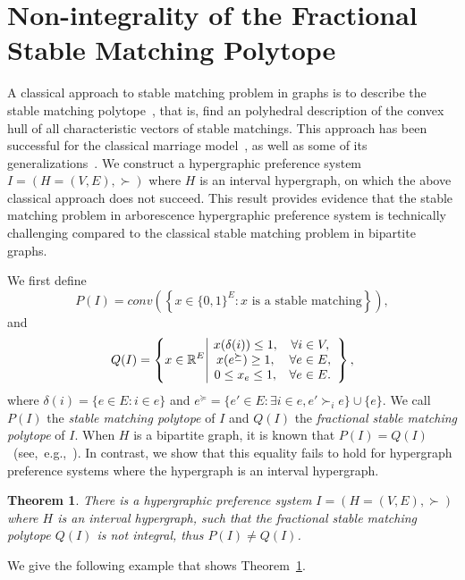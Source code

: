 \documentclass[11pt]{article}
\newtheorem{theorem}{Theorem}
\begin{document}
\section{Non-integrality of the Fractional Stable Matching Polytope}\label{sec:negative}




A classical approach to stable matching problem in graphs is to describe the stable matching polytope~\cite{teo1998geometry}, that is, find an polyhedral description of the convex hull of all characteristic vectors of stable matchings. This approach has been successful for the classical marriage model~\cite{rothblum1992characterization,vate1989linear}, as well as some of its generalizations~\cite{faenza2023affinely,fleiner2003stable}. We construct a hypergraphic preference system $I=(H=(V,E),\succ)$ where $H$ is an interval hypergraph, on which the above classical approach does not succeed. This result provides evidence that the stable matching problem in arborescence hypergraphic preference system is technically challenging compared to the classical stable matching problem in bipartite graphs. 

We first define 
\begin{equation}
    P(I)=conv\left(\left\{x\in \{0,1\}^E:x\textrm{ is a stable matching} 
    \right\}\right),
\end{equation}
and
\begin{equation}
    Q(I)=\left\{x\in \mathbb{R}^E\,\vline
    \begin{array}{cc}
      x(\delta(i)) \le 1,  &  \forall i\in V, \\
      x(e^\succeq) \ge 1,   & \forall e\in E, \\
      0\le x_e \le 1, & \forall e\in E.
    \end{array}
    \right\},
\end{equation}
where $\delta(i)=\{e\in E:i\in e\}$ and $e^\succeq=\{e'\in  E:\exists i\in e, e'\succ_i e\}\cup\{e\}$. We call $P(I)$ the \emph{stable matching polytope} of $I$ and $Q(I)$ the \emph{fractional stable matching polytope} of $I$. When $H$ is a bipartite graph, it is known that $P(I)=Q(I)$~(see,~e.g.,~\cite{teo1998geometry}). In contrast, we show that this equality fails to hold for hypergraph preference systems where the hypergraph is an interval hypergraph. 
\begin{theorem}\label{thm:neg}
    There is a hypergraphic preference system $I=(H=(V,E),\succ)$ where $H$ is an interval hypergraph, such that the fractional stable matching polytope $Q(I)$ is not integral, thus $P(I)\neq Q(I)$.
\end{theorem}
We give the following example that shows Theorem~\ref{thm:neg}.
\end{document}
